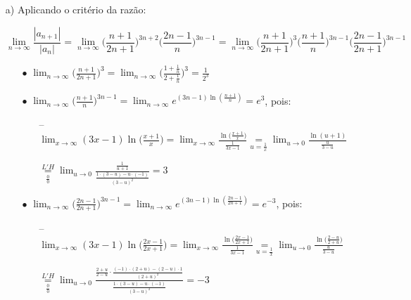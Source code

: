 \documentclass[12pt,a4paper]{article}
\begin{document}
\begin{itemize}
\item[a)] Aplicando o critério da razão:

$$\lim_{n\rightarrow\infty} \frac{|a_{n+1}|}{|a_n|} = \lim_{n\rightarrow\infty} \Big( \frac{n+1}{2n+1} \Big)^{3n+2} \Big( \frac{2n-1}{n} \Big)^{3n-1} = \lim_{n\rightarrow\infty}  \Big( \frac{n+1}{2n+1} \Big)^3 \Big( \frac{n+1}{n} \Big)^{3n-1} \Big( \frac{2n-1}{2n+1} \Big)^{3n-1} $$

\begin{itemize}
\item[$\bullet$] $\displaystyle\lim_{n\rightarrow\infty}  \Big( \displaystyle\frac{n+1}{2n+1} \Big)^3 = \displaystyle\lim_{n\rightarrow\infty}  \Big( \displaystyle\frac{1+\frac{1}{n}}{2+\frac{1}{n}} \Big)^3 = \displaystyle\frac{1}{2^3} $
\item[$\bullet$] $\displaystyle\lim_{n\rightarrow\infty} \Big( \displaystyle\frac{n+1}{n} \Big)^{3n-1} = \displaystyle\lim_{n\rightarrow\infty} e^{(3n-1) \ln(\frac{n+1}{n})} = e^3$, pois:
\begin{itemize}
\item[--] $\displaystyle\lim_{x\rightarrow\infty} (3x-1) \ln\Big(\frac{x+1}{x}\Big) = \displaystyle\lim_{x\rightarrow\infty} \frac{ \ln\big(\frac{x+1}{x}\big) }{\frac{1}{3x-1}} \underset{u = \frac{1}{x}}{=} \displaystyle\lim_{u\rightarrow 0} \frac{ \ln(u+1) }{\frac{u}{3-u}}$

$\underset{\frac{0}{0}}{\overset{L'H}{=}} \displaystyle\lim_{u\rightarrow 0} \displaystyle \frac{\frac{1}{u+1}}{\frac{1\cdot(3-u)-u\cdot(-1)}{(3-u)^2}}=3$
\end{itemize}
\item[$\bullet$] $\displaystyle\lim_{n\rightarrow\infty} \Big( \displaystyle\frac{2n-1}{2n+1} \Big)^{3n-1} = \displaystyle\lim_{n\rightarrow\infty} e^{(3n-1) \ln(\frac{2n-1}{2n+1})} = e^{-3}$, pois:
\begin{itemize}
\item[--] $\displaystyle\lim_{x\rightarrow\infty} (3x-1) \ln\Big(\frac{2x-1}{2x+1}\Big) = \displaystyle\lim_{x\rightarrow\infty} \frac{ \ln\big(\frac{2x-1}{2x+1}\big) }{\frac{1}{3x-1}} \underset{u = \frac{1}{x}}{=} \displaystyle\lim_{u\rightarrow 0} \frac{ \ln\big(\frac{2-u}{2+u}\big) }{\frac{u}{3-u}}$

$\underset{\frac{0}{0}}{\overset{L'H}{=}} \displaystyle\lim_{u\rightarrow 0} \displaystyle \frac{\frac{2+u}{2-u} \cdot \frac{(-1)\cdot(2+u)-(2-u)\cdot 1}{(2+u)^2}}{\frac{1\cdot(3-u)-u\cdot(-1)}{(3-u)^2}}= -3$
\end{itemize}
\end{itemize}


\end{itemize}
\end{document}

